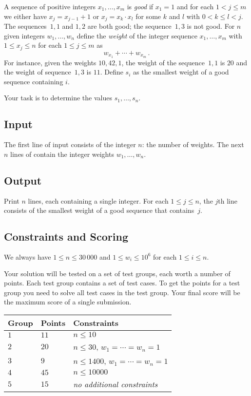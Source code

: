 
A sequence of positive integers $x_1,\ldots,x_m$ is \emph{good} if  $x_1 = 1$ and for each $1 < j \leq m$ we either have $x_j=x_{j-1}+1$ or $x_j=x_k\cdot x_l$ for some $k$ and $l$ with $0< k\leq l< j$.
The sequences~$1,1$ and $1,2$ are both good; the sequence~$1,3$ is not good.
For  $n$ given integers $w_1,\ldots,w_n$ define 
the \emph{weight} of the integer sequence $x_1,\ldots,x_m$ with $1\leq x_j \leq n$ for each $1\leq j\leq m$ as
\[ w_{x_1} +\cdots +w_{x_m}\,.\] 
For instance, given the weights $10, 42, 1$, the weight of the sequence~$1,1$ is $20$ and the weight of sequence~$1,3$ is $11$.
Define $s_i$ as the smallest weight of a good sequence containing $i$.

Your task is to determine the values $s_1,\ldots ,s_n$.

\subsection*{Input}

The first line of input consists of the integer $n$: the number of weights.
The next $n$ lines of contain the integer weights $w_1, \ldots, w_n$.

\subsection*{Output}

Print $n$ lines, each containing a single integer.
For each $1\leq j \leq n$, the $j$th line consists of the smallest weight of a good sequence that contains~$j$.

\subsection*{Constraints and Scoring}

We always have
$1\leq n \leq 30\,000$ %
and
$1\leq w_i \leq 10^6$ for each $1\leq i \leq n$.%

Your solution will be tested on a set of test groups, each worth a number of points.
Each test group contains a set of test cases.
To get the points for a test group you need to solve all test cases in the test group.
Your final score will be the maximum score of a single submission.

\medskip
\begin{tabular}{lll}
Group & Points & Constraints \\\hline
$1$   & $11$ & $n\leq 10$ \\
$2$   & $20$ & $n\leq 30$, $w_1=\cdots=w_n = 1$ \\
$3$   & $9$ & $n\leq 1400$, $w_1=\cdots=w_n = 1$ \\
$4$   & $45$ & $n\leq 10000$\\
$5$   & $15$ & \emph{no additional constraints}
\end{tabular}
